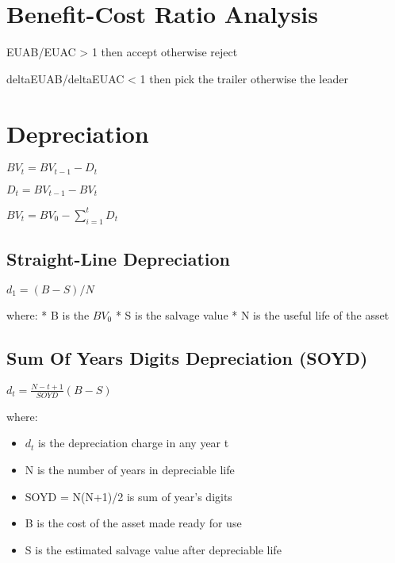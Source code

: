 \documentclass[]{article}
\providecommand{\tightlist}{%
  \setlength{\itemsep}{0pt}\setlength{\parskip}{0pt}}
\begin{document}
\hypertarget{benefit-cost-ratio-analysis}{%
\section{Benefit-Cost Ratio
Analysis}\label{benefit-cost-ratio-analysis}}

EUAB/EUAC \textgreater{} 1 then accept otherwise reject

deltaEUAB/deltaEUAC \textless{} 1 then pick the trailer otherwise the
leader

\hypertarget{depreciation}{%
\section{Depreciation}\label{depreciation}}

\(BV_{t} = BV_{t-1} - D_{t}\)

\(D_{t} = BV_{t-1} - BV_{t}\)

\(BV_{t}=BV_{0} - \sum_{i=1}^{t} D_{t}\)

\hypertarget{straight-line-depreciation}{%
\subsection{Straight-Line
Depreciation}\label{straight-line-depreciation}}

\(d_{1} = (B-S)/N\)

where: * B is the \(BV_{0}\) * S is the salvage value * N is the useful
life of the asset

\hypertarget{sum-of-years-digits-depreciation-soyd}{%
\subsection{Sum Of Years Digits Depreciation
(SOYD)}\label{sum-of-years-digits-depreciation-soyd}}

\(d_{t}=\frac{N-t+1}{SOYD}(B-S)\)

where:

\begin{itemize}
\tightlist
\item
  \(d_{t}\) is the depreciation charge in any year t
\item
  N is the number of years in depreciable life
\item
  SOYD = N(N+1)/2 is sum of year's digits
\item
  B is the cost of the asset made ready for use
\item
  S is the estimated salvage value after depreciable life
\end{itemize}
\end{document}

